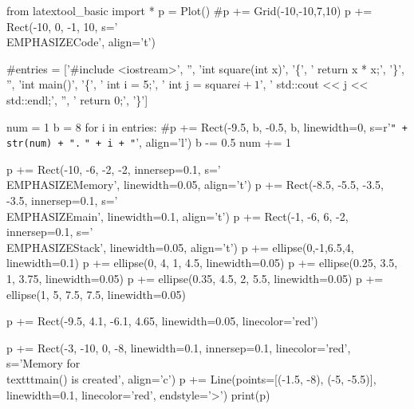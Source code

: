 \begin{python}
from latextool_basic import *
p = Plot()
#p += Grid(-10,-10,7,10)
p += Rect(-10, 0, -1, 10, s='\\EMPHASIZE{Code}', align='t')

#entries = ['\#include <iostream>', '', 'int square(int x)', '\{', '    return x * x;', '\}', '', 'int main()', '\{', '    int i = 5;', '    int j = square\(i + 1\)', '    std::cout << j << std::endl;', '', '    return 0;', '\}']

num = 1
b = 8
for i in entries:
    #p += Rect(-9.5, b, -0.5, b, linewidth=0, s=r'\texttt{" + str(num) + ".} \texttt{" + i + "}', align='l')
    b -= 0.5
    num += 1

p += Rect(-10, -6, -2, -2, innersep=0.1, s='\\EMPHASIZE{Memory}', linewidth=0.05, align='t')
p += Rect(-8.5, -5.5, -3.5, -3.5, innersep=0.1, s='\\EMPHASIZE{main}', linewidth=0.1, align='t')
p += Rect(-1, -6, 6, -2, innersep=0.1, s='\\EMPHASIZE{Stack}', linewidth=0.05, align='t')
p += ellipse(0,-1,6.5,4, linewidth=0.1)
p += ellipse(0, 4, 1, 4.5, linewidth=0.05)
p += ellipse(0.25, 3.5, 1, 3.75, linewidth=0.05)
p += ellipse(0.35, 4.5, 2, 5.5, linewidth=0.05)
p += ellipse(1, 5, 7.5, 7.5, linewidth=0.05)

p += Rect(-9.5, 4.1, -6.1, 4.65, linewidth=0.05, linecolor='red')

p += Rect(-3, -10, 0, -8, linewidth=0.1, innersep=0.1, linecolor='red', s='Memory for \\texttt{main()} is created', align='c')
p += Line(points=[(-1.5, -8), (-5, -5.5)], linewidth=0.1, linecolor='red', endstyle='>')
print(p)
\end{python}

